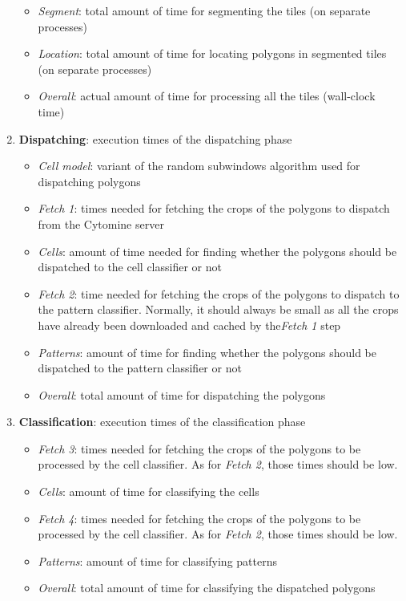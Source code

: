 \begin{enumerate}
\begin{itemize}
		\item \textit{Segment}: total amount of time for segmenting the tiles (on separate processes)
		\item \textit{Location}: total amount of time for locating polygons in segmented tiles (on separate processes)
		\item \textit{Overall}: actual amount of time for processing all the tiles (wall-clock time)
	\end{itemize}
	\item \textbf{Dispatching}: execution times of the dispatching phase
	\begin{itemize}
		\item \textit{Cell model}: variant of the random subwindows algorithm used for dispatching polygons
		\item \textit{Fetch 1}: times needed for fetching the crops of the polygons to dispatch from the Cytomine server
		\item \textit{Cells}: amount of time needed for finding whether the polygons should be dispatched to the cell classifier or not
		\item \textit{Fetch 2}: time needed for fetching the crops of the polygons to dispatch to the pattern classifier. Normally, it should always be small as all the crops have already been downloaded and cached by the\textit{Fetch 1} step
		\item \textit{Patterns}: amount of time for finding whether the polygons should be dispatched to the pattern classifier or not
		\item \textit{Overall}: total amount of time for dispatching the polygons 
	\end{itemize}
	\item \textbf{Classification}: execution times of the classification phase
	\begin{itemize}
		\item \textit{Fetch 3}: times needed for fetching the crops of the polygons to be processed by the cell classifier. As for \textit{Fetch 2}, those times should be low. 
		\item \textit{Cells}: amount of time for classifying the cells 
		\item \textit{Fetch 4}: times needed for fetching the crops of the polygons to be processed by the cell classifier. As for \textit{Fetch 2}, those times should be low.
		\item \textit{Patterns}: amount of time for classifying patterns
		\item \textit{Overall}: total amount of time for classifying the dispatched polygons

\end{itemize}
\end{enumerate}

